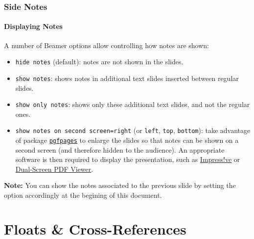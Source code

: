 \documentclass[10pt,    %
    english,            %
    xcolor=table,       %
    envcountsect,       %
    aspectratio=43      %
]{beamer}
\begin{document}
\begin{frame}   
    \label{frm:dispnotes}
    \frametitle{Side Notes}
    \framesubtitle{Displaying Notes}
        
    A number of Beamer options allow controlling how notes are shown:
    \begin{itemize}
        \item \texttt{hide notes} (default): notes are not shown in the slides.
        \item \texttt{show notes}: shows notes in additional text slides inserted between regular slides.
        \item \texttt{show only notes}: shows only these additional text slides, and not the regular ones.
        \item \texttt{show notes on second screen=right} (or \texttt{left}, \texttt{top}, \texttt{bottom}): take advantage of package \href{https://ctan.org/pkg/pdfpages?lang=en}{\texttt{pgfpages}} to enlarge the slides so that notes can be shown on a second screen (and therefore hidden to the audience). An appropriate software is then required to display the presentation, such as \href{http://impressive.sourceforge.net/}{Impress!ve} or \href{http://dspdfviewer.danny-edel.de/}{Dual-Screen PDF Viewer}.
    \end{itemize}
    
    \medskip
    \textbf{Note:} You can show the notes associated to the previous slide by setting the option accordingly at the begining of this document.
\end{frame}











\section{Floats \& Cross-References}
\sectionframe

\end{document}
